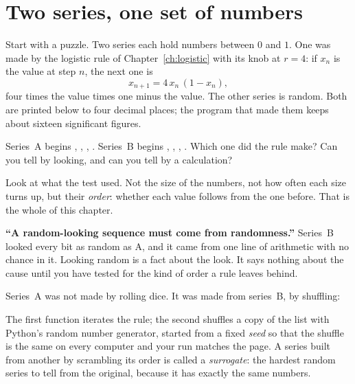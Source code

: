 \section{Two series, one set of numbers}
\label{sec:ch15-twins}

\noindent
Start with a puzzle. Two series each hold  numbers between $0$
and $1$. One was made by the logistic rule of Chapter~\ref{ch:logistic} with
its knob at $r = 4$: if $x_n$ is the value at step $n$, the next one is
\[ x_{n+1} = 4\,x_n\,(1 - x_n), \]
four times the value times one minus the value. The other series is random.
Both are printed below to four decimal places; the program that made them
keeps about sixteen significant figures.

\begin{think}
Series~A begins , , ,
. Series~B begins , ,
, . Which one did the rule make? Can you tell by
looking, and can you tell by a calculation?
\end{think}
Look at what the test used. Not the size of the numbers, not how often each
size turns up, but their \emph{order}: whether each value follows from the
one before. That is the whole of this chapter.

\begin{trapbox}
\textbf{\enquote{A random-looking sequence must come from randomness.}}
Series~B looked every bit as random as A, and it came from one line of
arithmetic with no chance in it. Looking random is a fact about the look. It
says nothing about the cause until you have tested for the kind of order a
rule leaves behind.
\end{trapbox}

\noindent
Series~A was not made by rolling dice. It was made from series~B, by
shuffling:


\noindent
The first function iterates the rule; the second shuffles a copy of the
list with Python's random number generator, started from a fixed
\emph{seed} so that the shuffle is the same on every computer and your run
matches the page. A series built from another by scrambling its order is
called a \emph{surrogate}: the hardest random
series to tell from the original, because it has exactly the same numbers.

